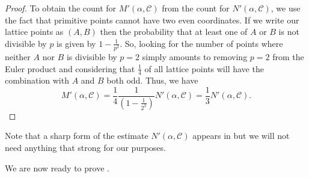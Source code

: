 \documentclass[12pt]{amsart}
\theoremstyle{plain}
\begin{document}
\begin{proof}
To obtain the count for $M'(\alpha, \mathcal{C})$ from the count for $N'(\alpha, \mathcal{C})$, we use the fact that primitive points cannot have two even coordinates.
If we write our lattice points as $(A, B)$ then the probability that at least one of $A$ or $B$ is not divisible by $p$ is given by $1 - \frac{1}{p^2}$. So, looking for the number of points where neither $A$ nor $B$ is divisible by $p = 2$ simply amounts to removing $p = 2$ from the Euler product and considering that $\frac{1}{4}$ of all lattice points will have the combination with $A$ and $B$ both odd. Thus, we have \[ M'(\alpha, \mathcal{C})= \frac{1}{4}\frac{1}{\left(1-\frac{1}{2^2}\right)} N'(\alpha, \mathcal{C})=\frac{1}{3} N'(\alpha, \mathcal{C}).  \]
\end{proof}

Note that a sharp form of the estimate $N'(\alpha, \mathcal{C})$ appears in \cite{huxleynowack} but we will not need anything that strong for our purposes. 

We are now ready to prove .
\end{document}
